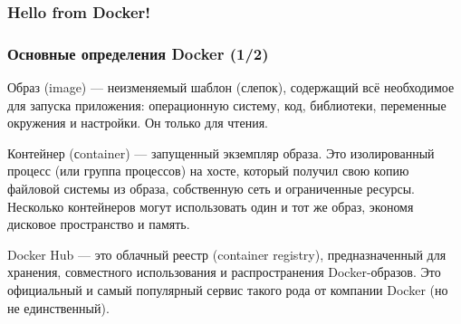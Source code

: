 \documentclass[9pt, aspectratio=1610]{beamer}
\begin{document}
\begin{frame}[fragile=singleslide]\frametitle{Hello from Docker!}
	
	
\end{frame}

\begin{frame}\frametitle{Основные определения Docker (1/2)}
	
	\begin{alertblock}{Образ (image) --- }
		неизменяемый шаблон (слепок), содержащий всё необходимое для запуска приложения: операционную систему, код, библиотеки, переменные окружения и настройки. Он только для чтения.
	\end{alertblock}
	
	\begin{alertblock}{Контейнер (сontainer) --- }
		запущенный экземпляр образа. Это изолированный процесс (или группа процессов) на хосте, который получил свою копию файловой системы из образа, собственную сеть и ограниченные ресурсы. Несколько контейнеров могут использовать один и тот же образ, экономя дисковое пространство и память.
	\end{alertblock}
	
	\begin{alertblock}{Docker Hub --- }
		это облачный реестр (container registry), предназначенный для хранения, совместного использования и распространения Docker-образов. Это официальный и самый популярный сервис такого рода от компании Docker (но не единственный).
	\end{alertblock}
	
\end{frame}
\end{document}
